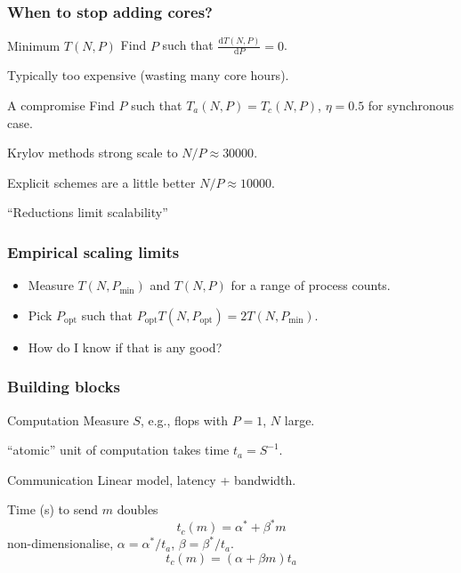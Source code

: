 \documentclass[presentation]{beamer}
\begin{document}
\begin{frame}
  \frametitle{When to stop adding cores?}

  \begin{block}{Minimum $T(N, P)$}
    Find $P$ such that $\frac{\text{d} T(N, P)}{\text{d} P} = 0$.

    Typically too expensive (wasting many core hours).
  \end{block}

  \begin{block}{A compromise}
    Find $P$ such that $T_a(N, P) = T_c(N, P)$, $\eta = 0.5$ for
    synchronous case.
  \end{block}

  \begin{theorem}[Anonymous]
    Krylov methods strong scale to $N/P \approx 30000$.

    Explicit schemes are a little better $N/P \approx 10000$.

    ``Reductions limit scalability''
  \end{theorem}
\end{frame}

\begin{frame}
  \frametitle{Empirical scaling limits}
  
  \begin{itemize}
  \item Measure $T(N, P_\text{min})$ and $T(N, P)$ for a range of
    process counts.

  \item Pick $P_\text{opt}$ such that
    $P_\text{opt}T(N, P_\text{opt}) = 2T(N,P_\text{min})$.

  \item How do I know if that is any good?
  \end{itemize}
\end{frame}

\begin{frame}
  \frametitle{Building blocks}
  \begin{block}{Computation}
    Measure $S$, e.g., flops with $P=1$, $N$ large.

    ``atomic'' unit of computation takes time $t_a = S^{-1}$.
  \end{block}

  \begin{block}{Communication}
    Linear model, latency + bandwidth.

    Time (s) to send $m$ doubles
    \begin{equation*}
      t_c(m) = \alpha^* + \beta^* m
    \end{equation*}
    non-dimensionalise, $\alpha = \alpha^*/t_a$, $\beta =
    \beta^*/t_a$.
    \begin{equation*}
      t_c(m) = (\alpha + \beta m)t_a
    \end{equation*}
  \end{block}
\end{frame}
\end{document}
